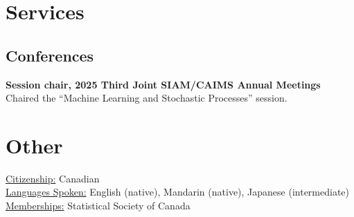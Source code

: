 \documentclass[11pt]{article}
\theoremstyle{definition}
\newcommand{\1}{\mathds 1}
\begin{document}
\section*{Services}
\subsection*{Conferences}
\textbf{Session chair, 2025 Third Joint SIAM/CAIMS Annual Meetings}\\
Chaired the ``Machine Learning and Stochastic Processes'' session.


\section*{Other}
\underline{Citizenship:} Canadian\\
\underline{Languages Spoken:} English (native), Mandarin (native), Japanese (intermediate)\\
\underline{Memberships:} Statistical Society of Canada
\end{document}
